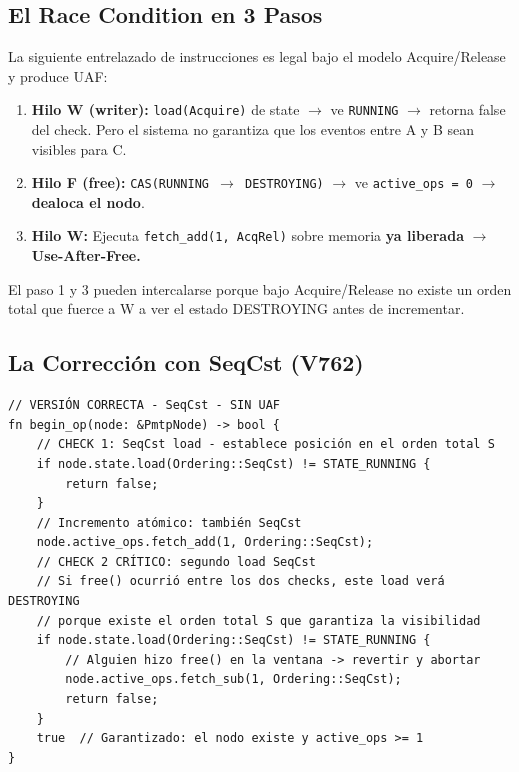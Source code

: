 \subsection{El Race Condition en 3 Pasos}

La siguiente entrelazado de instrucciones es legal bajo el modelo Acquire/Release
y produce UAF:

\begin{enumerate}
\item \textbf{Hilo W (writer):} \texttt{load(Acquire)} de state $\to$ ve \texttt{RUNNING} $\to$ retorna false del check.
   Pero el sistema no garantiza que los eventos entre A y B sean visibles para C.

\item \textbf{Hilo F (free):} \texttt{CAS(RUNNING $\to$ DESTROYING)} $\to$ ve \texttt{active\_ops = 0} $\to$
   \textbf{dealoca el nodo}.

\item \textbf{Hilo W:} Ejecuta \texttt{fetch\_add(1, AcqRel)} sobre memoria \textbf{ya liberada} $\to$
   \textbf{Use-After-Free.}
\end{enumerate}

El paso 1 y 3 pueden intercalarse porque bajo Acquire/Release no existe un
orden total que fuerce a W a ver el estado DESTROYING antes de incrementar.

\subsection{La Corrección con SeqCst (V762)}

\begin{lstlisting}[style=ruststyle, caption={Protocolo Quiescente (CORRECTO --- V762)}, label=lst:seqcst_correct]
// VERSIÓN CORRECTA - SeqCst - SIN UAF
fn begin_op(node: &PmtpNode) -> bool {
    // CHECK 1: SeqCst load - establece posición en el orden total S
    if node.state.load(Ordering::SeqCst) != STATE_RUNNING {
        return false;
    }
    // Incremento atómico: también SeqCst
    node.active_ops.fetch_add(1, Ordering::SeqCst);
    // CHECK 2 CRÍTICO: segundo load SeqCst
    // Si free() ocurrió entre los dos checks, este load verá DESTROYING
    // porque existe el orden total S que garantiza la visibilidad
    if node.state.load(Ordering::SeqCst) != STATE_RUNNING {
        // Alguien hizo free() en la ventana -> revertir y abortar
        node.active_ops.fetch_sub(1, Ordering::SeqCst);
        return false;
    }
    true  // Garantizado: el nodo existe y active_ops >= 1
}
\end{lstlisting}

